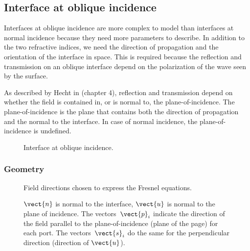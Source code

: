 
\subsection{Interface at oblique incidence}
\label{sec:interface_at_oblique_incidence}
Interfaces at oblique incidence are more complex to model than interfaces at normal incidence because they need more parameters to describe.
In addition to the two refractive indices, we need the direction of propagation and the orientation of the interface in space.
This is required because the reflection and transmission on an oblique interface depend on the polarization of the wave seen by the surface.

As described by Hecht in \cite{hecht2002optics} (chapter 4), reflection and transmission depend on whether the field is contained in, or is normal to, the plane-of-incidence.
The plane-of-incidence is the plane that contains both the direction of propagation and the normal to the interface.
In case of normal incidence, the plane-of-incidence is undefined.
\begin{figure}[hbtp]
    \centering
    \caption{\label{fig:net_interface_oblique}Interface at oblique incidence.}
\end{figure}

\subsubsection{Geometry}

\begin{figure}[hbtp]
    \centering
    
    \caption{\label{fig:fresnel_directions}Field directions chosen to express the Fresnel equations.}
    \caption*{
        $\vect{n}$ is normal to the interface,
        $\vect{u}$ is normal to the plane of incidence.
        The vectors~$\vect{p}_i$ indicate the direction of the field parallel to the plane-of-incidence (plane of the page) for each port.
        The vectors~$\vect{s}_i$ do the same for the perpendicular direction (direction of $\vect{u}$).
    }
\end{figure}


